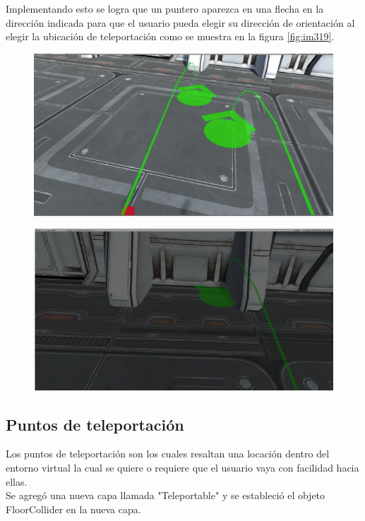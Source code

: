 Implementando esto se logra que un puntero aparezca en una flecha en la dirección indicada para que el usuario pueda elegir su dirección de orientación al elegir la ubicación de teleportación como se muestra en la figura \ref{fig:im319}.\\
\begin{figure}[H]
	\begin{center}
 		\includegraphics[width = .5\textwidth]{source/images/image62.png}
	\end{center} 
\end{figure}
\begin{figure}[H]
	\begin{center}
 		\includegraphics[width = .5\textwidth]{source/images/image4.png}
	\end{center} 
\end{figure}

\subsection{Puntos de teleportación}
Los puntos de teleportación son los cuales resaltan una locación dentro del entorno virtual la cual se quiere o requiere que el usuario vaya con facilidad hacia ellas.\\

Se agregó una nueva capa llamada "Teleportable" y se estableció el objeto FloorCollider en la nueva capa.\\

